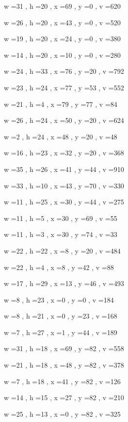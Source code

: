 \documentclass[11pt]{article}
\begin{document}
w =31 , h =20 , x =69 , y =0 , v =620
\par
w =26 , h =20 , x =43 , y =0 , v =520
\par
w =19 , h =20 , x =24 , y =0 , v =380
\par
w =14 , h =20 , x =10 , y =0 , v =280
\par
w =24 , h =33 , x =76 , y =20 , v =792
\par
w =23 , h =24 , x =77 , y =53 , v =552
\par
w =21 , h =4 , x =79 , y =77 , v =84
\par
w =26 , h =24 , x =50 , y =20 , v =624
\par
w =2 , h =24 , x =48 , y =20 , v =48
\par
w =16 , h =23 , x =32 , y =20 , v =368
\par
w =35 , h =26 , x =41 , y =44 , v =910
\par
w =33 , h =10 , x =43 , y =70 , v =330
\par
w =11 , h =25 , x =30 , y =44 , v =275
\par
w =11 , h =5 , x =30 , y =69 , v =55
\par
w =11 , h =3 , x =30 , y =74 , v =33
\par
w =22 , h =22 , x =8 , y =20 , v =484
\par
w =22 , h =4 , x =8 , y =42 , v =88
\par
w =17 , h =29 , x =13 , y =46 , v =493
\par
w =8 , h =23 , x =0 , y =0 , v =184
\par
w =8 , h =21 , x =0 , y =23 , v =168
\par
w =7 , h =27 , x =1 , y =44 , v =189
\par
w =31 , h =18 , x =69 , y =82 , v =558
\par
w =21 , h =18 , x =48 , y =82 , v =378
\par
w =7 , h =18 , x =41 , y =82 , v =126
\par
w =14 , h =15 , x =27 , y =82 , v =210
\par
w =25 , h =13 , x =0 , y =82 , v =325
\par
\newpage
\end{document}
